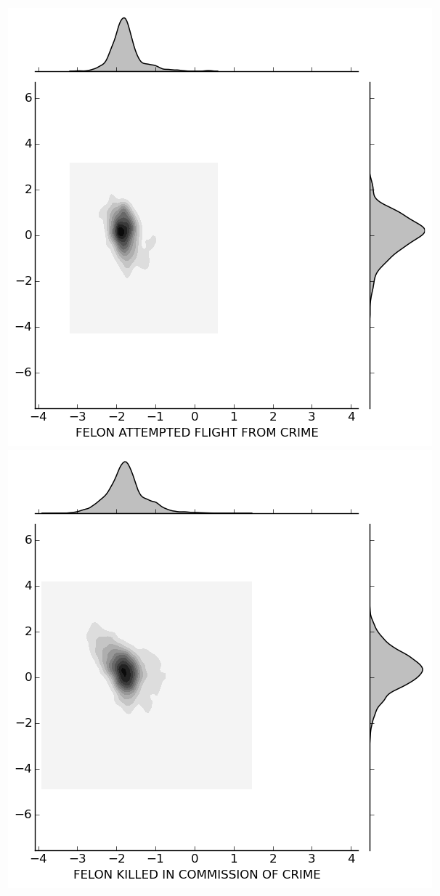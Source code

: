 \begin{figure}[H]
  \begin{minipage}[b]{0.30\linewidth}
    \includegraphics[width=\linewidth]{images/subcircum/FELON_ATTEMPTED_FLIGHT_FROM_CRIME.png}
  \end{minipage}
  \quad
  \begin{minipage}[b]{0.30\linewidth}
    \includegraphics[width=\linewidth]{images/subcircum/FELON_KILLED_IN_COMMISSION_OF_CRIME.png}

\end{minipage}
\end{figure}
